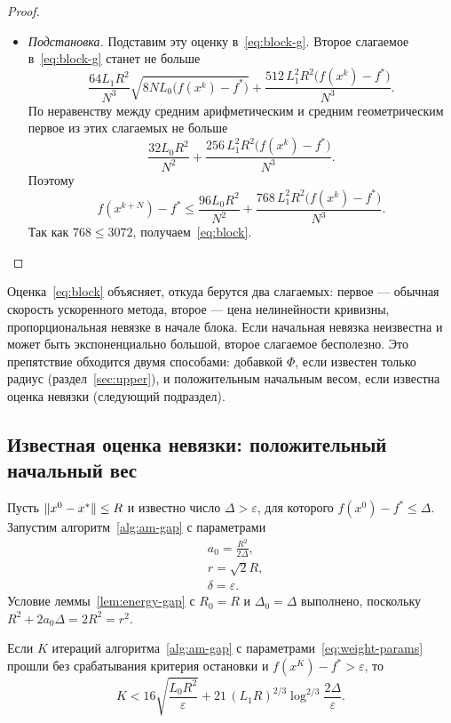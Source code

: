 \begin{proof}
\begin{itemize}
\[\]
\item \emph{Подстановка.} Подставим эту оценку в~\eqref{eq:block-g}. Второе слагаемое в~\eqref{eq:block-g} станет не больше
\[
 \frac{64L_1R^2}{N^3}\sqrt{8NL_0\bigl(f(x^k)-f^\ast\bigr)}+\frac{512\,L_1^2R^2\bigl(f(x^k)-f^\ast\bigr)}{N^3} .
\]
По неравенству между средним арифметическим и средним геометрическим первое из этих слагаемых не больше
\[
 \frac{32L_0R^2}{N^2}+\frac{256\,L_1^2R^2\bigl(f(x^k)-f^\ast\bigr)}{N^3} .
\]
Поэтому
\[
 f(x^{k+N})-f^\ast\le\frac{96L_0R^2}{N^2}+\frac{768\,L_1^2R^2\bigl(f(x^k)-f^\ast\bigr)}{N^3} .
\]
Так как $768\le3072$, получаем~\eqref{eq:block}.\qedhere
\end{itemize}
\end{proof}

Оценка~\eqref{eq:block} объясняет, откуда берутся два слагаемых: первое --- обычная скорость ускоренного метода, второе --- цена нелинейности кривизны, пропорциональная невязке в начале блока. Если начальная невязка неизвестна и может быть экспоненциально большой, второе слагаемое бесполезно. Это препятствие обходится двумя способами: добавкой $\Phi$, если известен только радиус (раздел~\ref{sec:upper}), и положительным начальным весом, если известна оценка невязки (следующий подраздел).

\subsection{Известная оценка невязки: положительный начальный вес}\label{sec:count2}

Пусть $\|x^0-x^\ast\|\le R$ и известно число $\Delta>\varepsilon$, для которого $f(x^0)-f^\ast\le\Delta$. Запустим алгоритм~\ref{alg:am-gap} с параметрами
\begin{equation}\label{eq:weight-params}
\begin{aligned}
 &a_0=\frac{R^2}{2\Delta},\\
 &r=\sqrt2R,\\
 &\delta=\varepsilon .
\end{aligned}
\end{equation}
Условие леммы~\ref{lem:energy-gap} с $R_0=R$ и $\Delta_0=\Delta$ выполнено, поскольку $R^2+2a_0\Delta=2R^2=r^2$.

\begin{lemma}\label{lem:count-weight}
Если $K$ итераций алгоритма~\ref{alg:am-gap} с параметрами~\eqref{eq:weight-params} прошли без срабатывания критерия остановки и $f(x^K)-f^\ast>\varepsilon$, то
\[
 K<16\sqrt{\frac{L_0R^2}\varepsilon}+21\,(L_1R)^{2/3}\log^{2/3}\frac{2\Delta}\varepsilon .
\]
\end{lemma}

